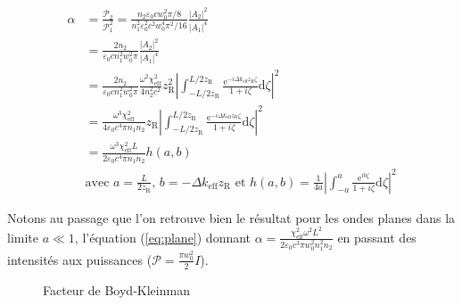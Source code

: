\documentclass[11pt,a4paper] { article}
\newcommand{\zr}{z_\mathsc{R}}
\newcommand{\chie}{\chi_\mathsc{eff}}
\renewcommand{\P}{\mathscr{P}}
\newcommand{\e}[1]{\text{e}^{#1}}
\newcommand{\mathsc}[1]{\mathrm{\scriptscriptstyle {#1}}}
\begin{document}
\begin{align*} 
	\alpha &= \frac{\P_2}{\P_1^2} = \frac{n_2 \varepsilon_0 c w_0^2 \pi/8}{n_1^2 \varepsilon_0^2 c^2 w_0^4 \pi^2/16} \frac{|A_2|^2}{|A_1|^4} \\
	&= \frac{2n_2}{\varepsilon_0 c n_1^2 w_0^2 \pi} \frac{|A_2|^2}{|A_1|^4} \\
	&= \frac{2n_2}{\varepsilon_0 c n_1^2 w_0^2 \pi} \frac{\omega^2\chi_\mathsc{eff}^2}{4 n_2^2 c^2} \zr^2 
	\left| \int_{-L/2\zr}^{L/2\zr} \frac{\e{-i\Delta k_\mathsc{eff} \zr \zeta}}{1+i\zeta} \mathrm d\zeta \right|^2\\
	&= \frac{\omega^3 \chie^2}{4 \varepsilon_0 c^4 \pi n_1 n_2} \zr 
	\left| \int_{-L/2\zr}^{L/2\zr} \frac{\e{-i\Delta k_\mathsc{eff} \zr \zeta}}{1+i\zeta} \mathrm d\zeta \right|^2\\
	&= \boxed{ \frac{\omega^3 \chie^2 L}{2 \varepsilon_0 c^4 \pi n_1 n_2} h(a,b) } \\
	&\text{avec } \boxed{ a=\frac{L}{2z_{\mathsc R}}\text{, } b=- \Delta k_\mathsc{eff} z_{\mathsc R}
	\text{ et } h(a,b)=\frac{1}{4a} \left|\int_{-a}^{a} \frac{\e{ib\zeta}}{1+i\zeta} \mathrm d\zeta \right|^2 }
\end{align*}


Notons au passage que l'on retrouve bien le résultat pour les ondes planes dans la limite $a\ll1$, l'équation (\ref{eq:plane}) donnant $\alpha = \frac{\chie^2 \omega^2 L^2}{2 \varepsilon_0 c^3 \pi w_0^2 n_1^2 n_2}$ en passant des intensités aux puissances ($\P = \frac{\pi w_0^2}{2} I$). 


\begin{figure}[htpb] 
\centering
\hspace*{-0.8cm}
\begin{subfigure}[b]{0.48\textwidth}
	\small
	
\end{subfigure}
\hspace{0.2cm}
\begin{subfigure}[b]{0.48\textwidth}
	\small
	
\end{subfigure}
\hspace{0.8cm}
\caption{Facteur de Boyd-Kleinman}
\label{fig:bk-factor}
\end{figure}
\end{document}
